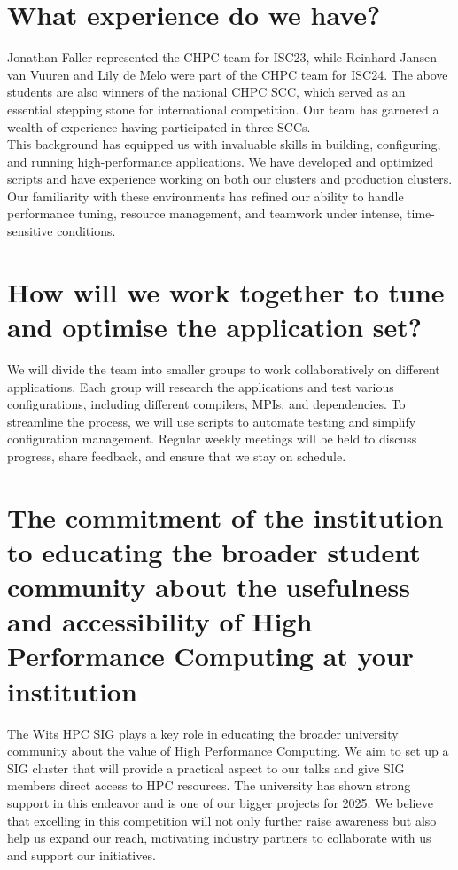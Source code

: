\documentclass[10pt, onecolumn]{IEEEtran}
\begin{document}
\section{What experience do we have?}
\noindent
Jonathan Faller represented the CHPC team for ISC23, while Reinhard Jansen van Vuuren and Lily de Melo were part of the CHPC team for ISC24. The above students are also winners of the national CHPC SCC, which served as an essential stepping stone for international competition. Our team has garnered a wealth of experience having participated in three SCCs. 
\\
This background has equipped us with invaluable skills in building, configuring, and running high-performance applications. We have developed and optimized scripts and have experience working on both our clusters and production clusters. Our familiarity with these environments has refined our ability to handle performance tuning, resource management, and teamwork under intense, time-sensitive conditions. 
\section{How will we work together to tune and optimise the application set?}
\noindent
We will divide the team into smaller groups to work collaboratively on different applications. Each group will research the applications and test various configurations, including different compilers, MPIs, and dependencies. To streamline the process, we will use scripts to automate testing and simplify configuration management. Regular weekly meetings will be held to discuss progress, share feedback, and ensure that we stay on schedule.
\section{The commitment of the institution to educating the broader student community about the usefulness and accessibility of High Performance Computing at your institution}
\noindent
The Wits HPC SIG plays a key role in educating the broader university community about the value of High Performance Computing. We aim to set up a SIG cluster that will provide a practical aspect to our talks and give SIG members direct access to HPC resources. The university has shown strong support in this endeavor and is one of our bigger projects for 2025. We believe that excelling in this competition will not only further raise awareness but also help us expand our reach, motivating industry partners to collaborate with us and support our initiatives.
\end{document}
